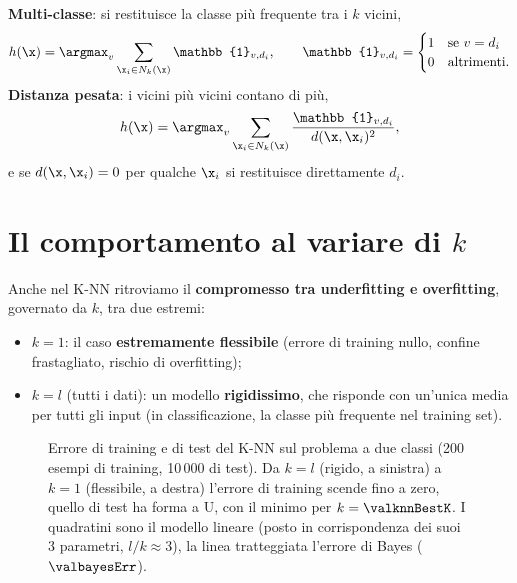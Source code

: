\textbf{Multi-classe}: si restituisce la classe più frequente tra i $k$ vicini,
\[
h(\x) = \argmax_v\sum_{\x_i\in N_k(\x)}\mathbb{1}_{v,d_i},\qquad
\mathbb{1}_{v,d_i} = \begin{cases}1 & \text{se } v=d_i\\ 0 & \text{altrimenti.}\end{cases}
\]
\textbf{Distanza pesata}: i vicini più vicini contano di più,
\[
h(\x) = \argmax_v\sum_{\x_i\in N_k(\x)}\frac{\mathbb{1}_{v,d_i}}{d(\x,\x_i)^2},
\]
e se $d(\x,\x_i)=0$ per qualche $\x_i$ si restituisce direttamente $d_i$.

\section{Il comportamento al variare di $k$}

Anche nel K-NN ritroviamo il \textbf{compromesso tra underfitting e overfitting}, governato da $k$, tra due
estremi:
\begin{itemize}
  \item $k=1$: il caso \textbf{estremamente flessibile} (errore di training nullo, confine frastagliato, rischio
        di overfitting);
  \item $k=l$ (tutti i dati): un modello \textbf{rigidissimo}, che risponde con un'unica media per tutti gli
        input (in classificazione, la classe più frequente nel training set).
\end{itemize}

\begin{figure}[ht]
\centering
{}
\caption{Errore di training e di test del K-NN sul problema a due classi (200 esempi di training, 10\,000 di
test). Da $k=l$ (rigido, a sinistra) a $k=1$ (flessibile, a destra) l'errore di training scende fino a zero,
quello di test ha forma a U, con il minimo per $k=\valknnBestK$. I quadratini sono il modello lineare (posto in
corrispondenza dei suoi 3 parametri, $l/k\approx3$), la linea tratteggiata l'errore di Bayes ($\valbayesErr$).}
\label{fig:knn-errori}
\end{figure}

